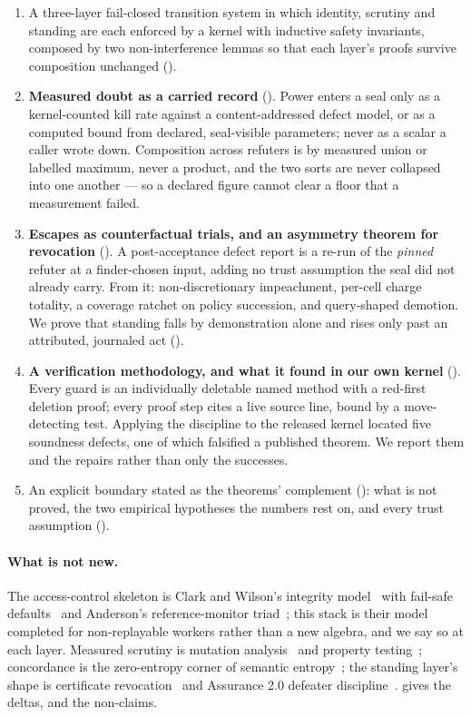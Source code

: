 \documentclass[11pt,a4paper]{article}
\theoremstyle{plain}
\theoremstyle{definition}
\theoremstyle{remark}
\begin{document}
\begin{enumerate}[leftmargin=*,itemsep=3pt]
  \item A three-layer fail-closed transition system in which identity, scrutiny and standing are each enforced by a kernel with inductive safety invariants, composed by two non-interference lemmas so that each layer's proofs survive composition unchanged ().
  \item \textbf{Measured doubt as a carried record} (). Power enters a seal only as a kernel-counted kill rate against a content-addressed defect model, or as a computed bound from declared, seal-visible parameters; never as a scalar a caller wrote down. Composition across refuters is by measured union or labelled maximum, never a product, and the two sorts are never collapsed into one another --- so a declared figure cannot clear a floor that a measurement failed.
  \item \textbf{Escapes as counterfactual trials, and an asymmetry theorem for revocation} (). A post-acceptance defect report is a re-run of the \emph{pinned} refuter at a finder-chosen input, adding no trust assumption the seal did not already carry. From it: non-discretionary impeachment, per-cell charge totality, a coverage ratchet on policy succession, and query-shaped demotion. We prove that standing falls by demonstration alone and rises only past an attributed, journaled act ().
  \item \textbf{A verification methodology, and what it found in our own kernel} (). Every guard is an individually deletable named method with a red-first deletion proof; every proof step cites a live source line, bound by a move-detecting test. Applying the discipline to the released kernel located five soundness defects, one of which falsified a published theorem. We report them and the repairs rather than only the successes.
  \item An explicit boundary stated as the theorems' complement (): what is not proved, the two empirical hypotheses the numbers rest on, and every trust assumption ().
\end{enumerate}

\paragraph{What is not new.} The access-control skeleton is Clark and Wilson's integrity model~\cite{clarkwilson} with fail-safe defaults~\cite{saltzer} and Anderson's reference-monitor triad~\cite{anderson}; this stack is their model completed for non-replayable workers rather than a new algebra, and we say so at each layer. Measured scrutiny is mutation analysis~\cite{demillo,jiaharman,just} and property testing~\cite{ggr}; concordance is the zero-entropy corner of semantic entropy~\cite{kuhn,farquhar}; the standing layer's shape is certificate revocation~\cite{rfc5280} and Assurance 2.0 defeater discipline~\cite{bloomfield}.  gives the deltas, and  the non-claims.
\end{document}
